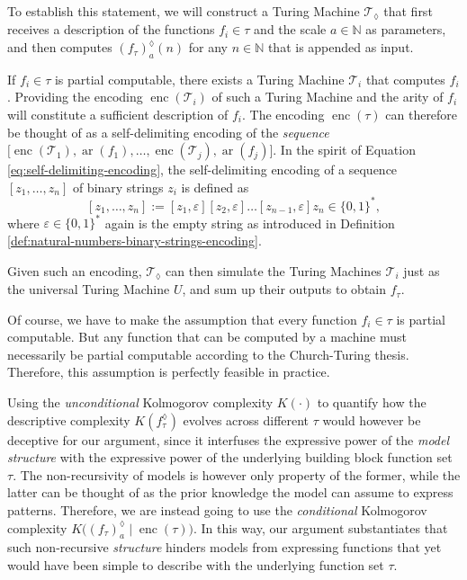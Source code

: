 To establish this statement, we will construct a Turing Machine $\mathcal{T}_{\lozenge}$ that first receives a description of the functions $f_i\in\tau$ and the scale $a\in\mathbb{N}$ as parameters, and then computes $\left(f_{\tau}\right)_a^{\lozenge}(n)$ for any $n\in\mathbb{N}$ that is appended as input. 

If $f_i \in\tau$ is partial computable, there exists a Turing Machine $\mathcal{T}_i$ that computes $f_i$.
Providing the encoding $\operatorname{enc}(\mathcal{T}_i)$ of such a Turing Machine and the arity of $f_i$ will constitute a sufficient description of $f_i$.
The encoding $\operatorname{enc}(\tau)$ can therefore be thought of as a self-delimiting encoding of the \textit{sequence} $\bigl[\operatorname{enc}(\mathcal{T}_1),\operatorname{ar}(f_1),\dots,\operatorname{enc}(\mathcal{T}_j),\operatorname{ar}(f_j)\bigr]$.
In the spirit of Equation \ref{eq:self-delimiting-encoding}, the self-delimiting encoding of a sequence $[z_1,\dots,z_n]$ of binary strings $z_i$ is defined as
\begin{equation}
	\label{eq:self-delimiting-enc-sequence}
	[z_1,\dots,z_n]:=[z_1,\varepsilon][z_2,\varepsilon]\dots[z_{n-1},\varepsilon]z_n\in\{0,1\}^{*},
\end{equation}
where $\varepsilon\in\{0,1\}^{*}$ again is the empty string as introduced in Definition \ref{def:natural-numbers-binary-strings-encoding}.

Given such an encoding, $\mathcal{T}_{\lozenge}$ can then simulate the Turing Machines $\mathcal{T}_i$ just as the universal Turing Machine $U$, and sum up their outputs to obtain $f_{\tau}$.

Of course, we have to make the assumption that every function $f_i\in\tau$ is partial computable.
But any function that can be computed by a machine must necessarily be partial computable according to the Church-Turing thesis.
Therefore, this assumption is perfectly feasible in practice.  

Using the \textit{unconditional} Kolmogorov complexity $K(\cdot)$ to quantify how the descriptive complexity $K\left(f_{\tau}^{\lozenge}\right)$ evolves across different $\tau$ would however be deceptive for our argument, since it interfuses the expressive power of the \textit{model structure} with the expressive power of the underlying building block function set $\tau$.
The non-recursivity of models is however only property of the former, while the latter can be thought of as the prior knowledge the model can assume to express patterns.
Therefore, we are instead going to use the \textit{conditional} Kolmogorov complexity $K\bigl(\left(f_{\tau}\right)_{a}^{\lozenge}\mid \operatorname{enc}(\tau)\bigr)$.
In this way, our argument substantiates that such non-recursive \textit{structure} hinders models from expressing functions that yet would have been simple to describe with the underlying function set $\tau$.

